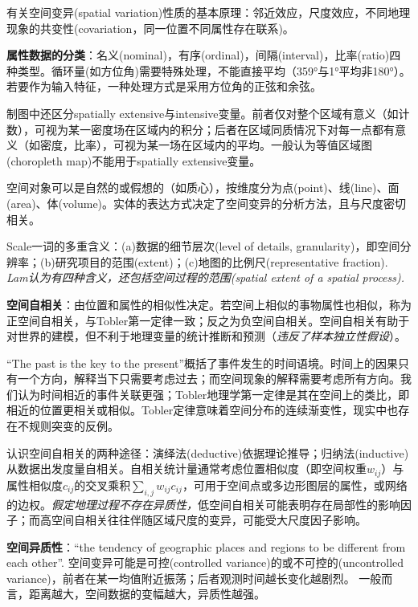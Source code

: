 \par 有关空间变异(spatial variation)性质的基本原理：邻近效应，尺度效应，不同地理现象的共变性(covariation，同一位置不同属性存在联系)。
\par \textbf{属性数据的分类}：名义(nominal)，有序(ordinal)，间隔(interval)，比率(ratio)四种类型。循环量(如方位角)需要特殊处理，不能直接平均（359°与1°平均非180°）。若要作为输入特征，一种处理方式是采用方位角的正弦和余弦。
\par 制图中还区分spatially extensive与intensive变量。前者仅对整个区域有意义（如计数），可视为某一密度场在区域内的积分；后者在区域同质情况下对每一点都有意义（如密度，比率），可视为某一场在区域内的平均。一般认为等值区域图(choropleth map)不能用于spatially extensive变量。
\par 空间对象可以是自然的或假想的（如质心），按维度分为点(point)、线(line)、面(area)、体(volume)。实体的表达方式决定了空间变异的分析方法，且与尺度密切相关。
\par Scale一词的多重含义：(a)数据的细节层次(level of details, granularity)，即空间分辨率；(b)研究项目的范围(extent)；(c)地图的比例尺(representative fraction). \emph{Lam认为有四种含义，还包括空间过程的范围(spatial extent of a spatial process).}

\par \textbf{空间自相关}：由位置和属性的相似性决定。若空间上相似的事物属性也相似，称为正空间自相关，与Tobler第一定律一致；反之为负空间自相关。空间自相关有助于对世界的建模，但不利于地理变量的统计推断和预测（\emph{违反了样本独立性假设}）。
\par ``The past is the key to the present''概括了事件发生的时间语境。时间上的因果只有一个方向，解释当下只需要考虑过去；而空间现象的解释需要考虑所有方向。我们认为时间相近的事件关联更强；Tobler地理学第一定律是其在空间上的类比，即相近的位置更相关或相似。Tobler定律意味着空间分布的连续渐变性，现实中也存在不规则突变的反例。
\par 认识空间自相关的两种途径：演绎法(deductive)依据理论推导；归纳法(inductive)从数据出发度量自相关。自相关统计量通常考虑位置相似度（即空间权重$w_{ij}$）与属性相似度$c_{ij}$的交叉乘积$\sum_{i,j}w_{ij}c_{ij}$，可用于空间点或多边形图层的属性，或网络的边权。\emph{假定地理过程不存在异质性，}低空间自相关可能表明存在局部性的影响因子；而高空间自相关往往伴随区域尺度的变异，可能受大尺度因子影响。

\par \textbf{空间异质性}：``the tendency of geographic places and regions to be different from each other''. 空间变异可能是可控(controlled variance)的或不可控的(uncontrolled variance)，前者在某一均值附近振荡；后者观测时间越长变化越剧烈。 一般而言，距离越大，空间数据的变幅越大，异质性越强。

